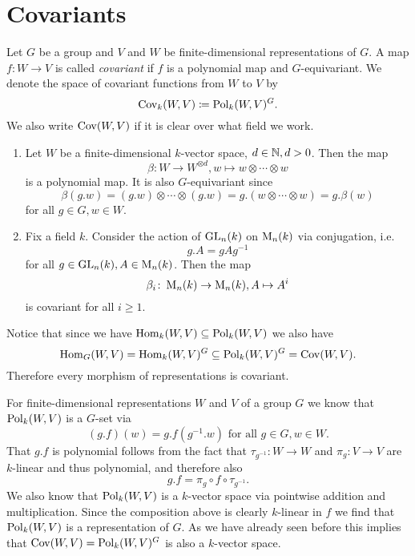 \section{Covariants}


\begin{defi}
 Let $G$ be a group and $V$ and $W$ be finite-dimensional representations of $G$. A map $f \colon W \to V$ is called \emph{covariant} if $f$ is a polynomial map and $G$-equivariant. We denote the space of covariant functions from $W$ to $V$ by
 \[
  \operatorname{Cov}_k(W,V) \coloneqq  \operatorname{Pol}_k(W,V)^G.
 \]
 We also write $\operatorname{Cov}(W,V)$ if it is clear over what field we work.
\end{defi}


\begin{expls}
 \begin{enumerate}[label=\emph{\alph*)},leftmargin=*]
  \item
   Let $W$ be a finite-dimensional $k$-vector space, $d \in \mathbb{N}, d > 0$. Then the map
   \[
    \beta \colon W \to W^{\otimes d}, w \mapsto w \otimes \dotsb \otimes w
   \]
   is a polynomial map. It is also $G$-equivariant since
   \[
    \beta(g.w) = (g.w) \otimes \dotsb \otimes (g.w) = g.(w \otimes \dotsb \otimes w) = g.\beta(w)
   \]
   for all $g \in G, w \in W$.
  \item
   Fix a field $k$. Consider the action of $\operatorname{GL}_n(k)$ on $\operatorname{M}_n(k)$ via conjugation, i.e.
   \[
    g.A = gAg^{-1}
   \]
   for all $g \in \operatorname{GL}_n(k), A \in \operatorname{M}_n(k)$. Then the map
   \[
    \beta_i \colon \operatorname{M}_n(k) \to \operatorname{M}_n(k), A \mapsto A^i
   \]
   is covariant for all $i \geq 1$. 
 \end{enumerate}
\end{expls}


Notice that since we have $\operatorname{Hom}_k(W,V) \subseteq \operatorname{Pol}_k(W,V)$ we also have
\[
 \operatorname{Hom}_G(W,V) = \operatorname{Hom}_k(W,V)^G \subseteq \operatorname{Pol}_k(W,V)^G = \operatorname{Cov}(W,V).
\]
Therefore every morphism of representations is covariant.


For finite-dimensional representations $W$ and $V$ of a group $G$ we know that $\operatorname{Pol}_k(W,V)$ is a $G$-set via
\[
 (g.f)(w) = g.f\left(g^{-1}.w\right) \text{ for all } g \in G, w \in W.
\]
That $g.f$ is polynomial follows from the fact that $\tau_{g^{-1}} \colon W \to W$ and $\pi_g \colon V \to V$ are $k$-linear and thus polynomial, and therefore also
\[
 g.f = \pi_g \circ f \circ \tau_{g^{-1}}.
\]
We also know that $\operatorname{Pol}_k(W,V)$ is a $k$-vector space via pointwise addition and multiplication. Since the composition above is clearly $k$-linear in $f$ we find that $\operatorname{Pol}_k(W,V)$ is a representation of $G$. As we have already seen before this implies that $\operatorname{Cov}(W,V) = \operatorname{Pol}_k(W,V)^G$ is also a $k$-vector space.


